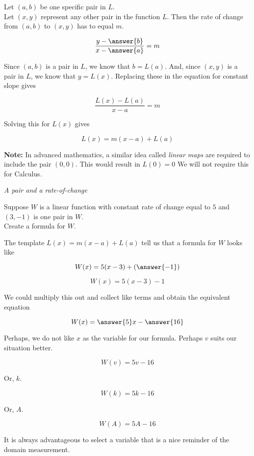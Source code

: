 \documentclass{ximera}
\begin{document}
Let $(a, b)$ be one specific pair in $L$.\\


Let $(x, y)$ represent any other pair in the function $L$. Then the rate of change from $(a,b)$ to $(x, y)$ has to equal $m$.


\[  \frac{y - \answer{b}}{x-\answer{a}} = m \]

Since $(a, b)$ is a pair in $L$, we know that $b = L(a)$.  And, since $(x, y)$ is a pair in $L$, we know that $y = L(x)$.  Replacing these in the equation for constant slope gives


\[  \frac{L(x) - L(a)}{x-a} = m \]

Solving this for $L(x)$ gives

\[  L(x) = m (x-a) + L(a)     \]



\textbf{Note:} In advanced mathematics, a similar idea called \textit{linear maps} are required to include the pair $(0,0)$.  This would result in $L(0) = 0$  We will not require this for Calculus.




\begin{example} \textit{A pair and a rate-of-change}


Suppose $W$ is a linear function with constant rate of change equal to $5$ and $(3, -1)$ is one pair in $W$.  \\

Create a formula for $W$.

\begin{explanation}

The template $L(x) = m (x-a) + L(a)$ tell us that a formula for $W$ looks like 


\[  W(x) = 5 (x-3) + \left(\answer{-1}\right)     \]


\[  W(x) = 5 (x-3) - 1     \]

We could multiply this out and collect like terms and obtain the equivalent equation


\[  W(x) = \answer{5}x - \answer{16}   \]

\end{explanation}

Perhaps, we do not like $x$ as the variable for our formula.  Perhaps $v$ suits our situation better.

\[  W(v) = 5v - 16   \]


Or, $k$.

\[  W(k) = 5k - 16   \]


Or, $A$.

\[  W(A) = 5A - 16   \]


It is always advantageous to select a variable that is a nice reminder of the domain measurement.

\end{example}
\end{document}
